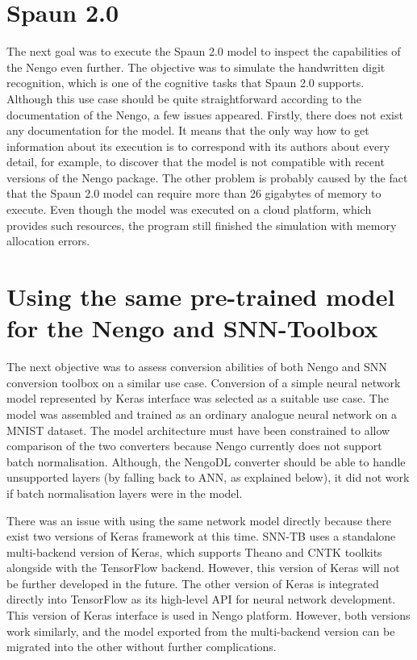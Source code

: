 \section{Spaun 2.0}
The next goal was to execute the Spaun 2.0 model to inspect the capabilities of the Nengo even further. The objective was to simulate the handwritten digit recognition, which is one of the cognitive tasks that Spaun 2.0 supports. Although this use case should be quite straightforward according to the documentation of the Nengo, a few issues appeared. Firstly, there does not exist any documentation for the model. It means that the only way how to get information about its execution is to correspond with its authors about every detail, for example, to discover that the model is not compatible with recent versions of the Nengo package. The other problem is probably caused by the fact that the Spaun 2.0 model can require more than 26 gigabytes of memory to execute. Even though the model was executed on a cloud platform, which provides such resources, the program still finished the simulation with memory allocation errors.

\section{Using the same pre-trained model for the Nengo and SNN-Toolbox}
The next objective was to assess conversion abilities of both Nengo and SNN conversion toolbox on a similar use case. Conversion of a simple neural network model represented by Keras interface was selected as a suitable use case. The model was assembled and trained as an ordinary analogue neural network on a MNIST dataset. The model architecture must have been constrained to allow comparison of the two converters because Nengo currently does not support batch normalisation. Although, the NengoDL converter should be able to handle unsupported layers (by falling back to ANN, as explained below), it did not work if batch normalisation layers were in the model.\par
There was an issue with using the same network model directly because there exist two versions of Keras framework at this time. SNN-TB uses a standalone multi-backend version of Keras, which supports Theano and CNTK toolkits alongside with the TensorFlow backend. However, this version of Keras will not be further developed in the future. The other version of Keras is integrated directly into TensorFlow as its high-level API for neural network development. This version of Keras interface is used in Nengo platform. However, both versions work similarly, and the model exported from the multi-backend version can be migrated into the other without further complications.

